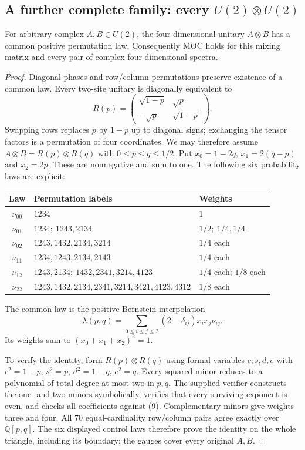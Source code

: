 \subsection{A further complete family: every $U(2)\otimes U(2)$}
\begin{theorem}\label{tensor}
For arbitrary complex $A,B\in U(2)$, the four-dimensional unitary $A\otimes B$ has a common positive permutation law. Consequently MOC holds for this mixing matrix and every pair of complex four-dimensional spectra.
\end{theorem}
\begin{proof}
Diagonal phases and row/column permutations preserve existence of a common law. Every two-site unitary is diagonally equivalent to
\[
R(p)=\begin{pmatrix}\sqrt{1-p}&\sqrt p\\-\sqrt p&\sqrt{1-p}\end{pmatrix}.
\]
Swapping rows replaces $p$ by $1-p$ up to diagonal signs; exchanging the tensor factors is a permutation of four coordinates. We may therefore assume
$A\otimes B=R(p)\otimes R(q)$ with $0\le p\le q\le1/2$.
Put $x_0=1-2q$, $x_1=2(q-p)$ and $x_2=2p$. These are nonnegative and sum to one. The following six probability laws are explicit:
\begin{center}\small\begin{tabular}{cll}
\toprule Law & Permutation labels & Weights\\\midrule
$\nu_{00}$ & $1234$ & $1$\\
$\nu_{01}$ & $1234;\ 1243,2134$ & $1/2;\ 1/4,1/4$\\
$\nu_{02}$ & $1243,1432,2134,3214$ & $1/4$ each\\
$\nu_{11}$ & $1234,1243,2134,2143$ & $1/4$ each\\
$\nu_{12}$ & $1243,2134;\ 1432,2341,3214,4123$ & $1/4$ each; $1/8$ each\\
$\nu_{22}$ & $1243,1432,2134,2341,3214,3421,4123,4312$ & $1/8$ each\\\bottomrule
\end{tabular}\end{center}
The common law is the positive Bernstein interpolation
\[
\lambda(p,q)=\sum_{0\le i\le j\le2}(2-\delta_{ij})x_ix_j\nu_{ij}.
\tag{9}
\]
Its weights sum to $(x_0+x_1+x_2)^2=1$.

To verify the identity, form $R(p)\otimes R(q)$ using formal variables $c,s,d,e$ with $c^2=1-p$, $s^2=p$, $d^2=1-q$, $e^2=q$. Every squared minor reduces to a polynomial of total degree at most two in $p,q$. The supplied verifier constructs the one- and two-minors symbolically, verifies that every surviving exponent is even, and checks all coefficients against (9). Complementary minors give weights three and four. All 70 equal-cardinality row/column pairs agree exactly over $\mathbb Q[p,q]$. The six displayed control laws therefore prove the identity on the whole triangle, including its boundary; the gauges cover every original $A,B$.
\end{proof}

